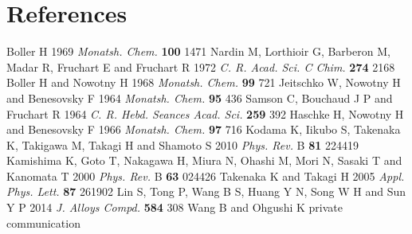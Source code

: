 \documentclass[a4paper]{jpconf}
\begin{document}
\section*{References}
\begin{thebibliography}{999}
 Boller H 1969 {\it Monatsh. Chem.} {\bf 100} 1471
 Nardin M, Lorthioir G, Barberon M, Madar R, Fruchart E and Fruchart R 1972 {\it C. R. Acad. Sci. C Chim.} {\bf 274} 2168
 Boller H and Nowotny H 1968 {\it Monatsh. Chem.} {\bf 99}  721
 Jeitschko W, Nowotny H and Benesovsky F 1964 {\it Monatsh. Chem.} {\bf 95} 436
 Samson C, Bouchaud J P and Fruchart R 1964 {\it C. R. Hebd. Seances Acad. Sci.} {\bf 259} 392
 Haschke H, Nowotny H and Benesovsky F 1966 {\it Monatsh. Chem.} {\bf 97} 716
 Kodama K, Iikubo S, Takenaka K, Takigawa M, Takagi H and Shamoto S 2010 {\it Phys. Rev.} B {\bf 81}  224419
 Kamishima K, Goto T, Nakagawa H, Miura N, Ohashi M, Mori N, Sasaki T and Kanomata T 2000 {\it Phys. Rev.} B {\bf 63} 024426
 Takenaka K and Takagi H 2005 {\it Appl. Phys. Lett.} {\bf 87} 261902
 Lin S, Tong P, Wang B S, Huang Y N, Song W H and Sun Y P 2014 {\it J. Alloys Compd.} {\bf 584} 308
 Wang B and Ohgushi K private communication


\end{thebibliography}
\end{document}
